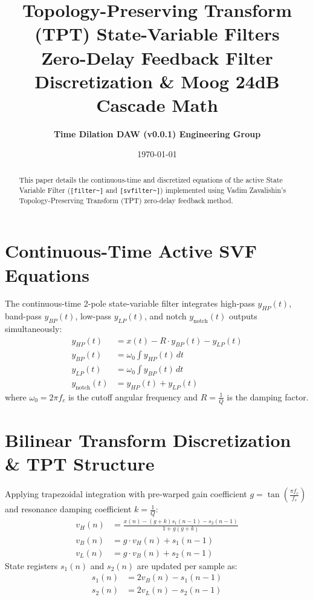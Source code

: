 \documentclass[11pt,a4paper]{article}
\title{\textbf{\Huge Topology-Preserving Transform (TPT) State-Variable Filters}\\[0.5em]
\Large Zero-Delay Feedback Filter Discretization \& Moog 24dB Cascade Math}
\author{\textbf{Time Dilation DAW (v0.0.1) Engineering Group}}
\date{\today}
\begin{document}
\maketitle

\begin{abstract}
This paper details the continuous-time and discretized equations of the active State Variable Filter (\texttt{[filter\textasciitilde{}]} and \texttt{[svfilter\textasciitilde{}]}) implemented using Vadim Zavalishin's Topology-Preserving Transform (TPT) zero-delay feedback method.
\end{abstract}

\section{Continuous-Time Active SVF Equations}
The continuous-time 2-pole state-variable filter integrates high-pass $y_{HP}(t)$, band-pass $y_{BP}(t)$, low-pass $y_{LP}(t)$, and notch $y_{\text{notch}}(t)$ outputs simultaneously:
\begin{align}
y_{HP}(t) &= x(t) - R \cdot y_{BP}(t) - y_{LP}(t) \\
y_{BP}(t) &= \omega_0 \int y_{HP}(t) \, dt \\
y_{LP}(t) &= \omega_0 \int y_{BP}(t) \, dt \\
y_{\text{notch}}(t) &= y_{HP}(t) + y_{LP}(t)
\end{align}
where $\omega_0 = 2\pi f_c$ is the cutoff angular frequency and $R = \frac{1}{Q}$ is the damping factor.

\section{Bilinear Transform Discretization \& TPT Structure}
Applying trapezoidal integration with pre-warped gain coefficient $g = \tan\left(\frac{\pi f_c}{f_s}\right)$ and resonance damping coefficient $k = \frac{1}{Q}$:
\begin{align}
v_H(n) &= \frac{x(n) - (g + k) s_1(n-1) - s_2(n-1)}{1 + g(g + k)} \\
v_B(n) &= g \cdot v_H(n) + s_1(n-1) \\
v_L(n) &= g \cdot v_B(n) + s_2(n-1)
\end{align}
State registers $s_1(n)$ and $s_2(n)$ are updated per sample as:
\begin{align}
s_1(n) &= 2 v_B(n) - s_1(n-1) \\
s_2(n) &= 2 v_L(n) - s_2(n-1)
\end{align}
\end{document}
